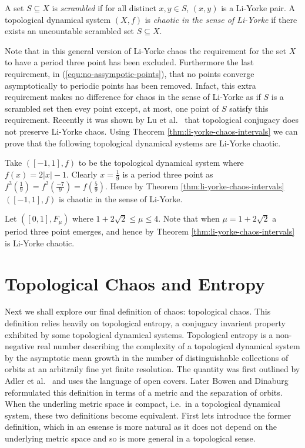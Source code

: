 \begin{defn}  \label{defn:scrambled-set}
    A set $S \subseteq X$ is \emph{scrambled} if for all distinct $x, y \in S$, $(x, y)$ is a Li-Yorke pair. A topological dynamical system $(X, f)$ is \emph{chaotic in the sense of Li-Yorke} if there exists an uncountable scrambled set $S \subseteq X$.
\end{defn}

Note that in this general version of Li-Yorke chaos the requirement for the set $X$ to have a period three point has been excluded. Furthermore the last requirement, in (\ref{equ:no-assympotic-points}), that no points converge asymptotically to periodic points has been removed. Infact, this extra requirement makes no difference for chaos in the sense of Li-Yorke as if $S$ is a scrambled set then evey point except, at most, one point of $S$ satisfy this requirement. Recently it was shown by Lu et al.\ \cite{lu-zhu-wu} that topological conjugacy does not preserve Li-Yorke chaos. Using Theorem \ref{thm:li-yorke-chaos-intervals} we can prove that the following topological dynamical systems are Li-Yorke chaotic.

\begin{exmp}
    Take $([-1, 1], f)$ to be the topological dynamical system where $f(x) = 2 |x| - 1$. Clearly $x = \frac{1}{9}$ is a period three point as $f^3\left(\frac{1}{9}\right) = f^2\left(\frac{-7}{9}\right) = f\left(\frac{5}{9}\right)$. Hence by Theorem \ref{thm:li-yorke-chaos-intervals} $([-1, 1], f)$ is chaotic in the sense of Li-Yorke.
\end{exmp}

\begin{exmp}
    Let $([0, 1], F_\mu)$ where $1 + 2\sqrt{2} \leq \mu \leq 4$. Note that when $\mu = 1 + 2\sqrt{2}$ a period three point emerges, and hence by Theorem \ref{thm:li-yorke-chaos-intervals} is Li-Yorke chaotic.
\end{exmp}

\section{Topological Chaos and Entropy} \label{sec:topological-chaos}
Next we shall explore our final definition of chaos: topological chaos. This definition relies heavily on topological entropy, a conjugacy invarient property exhibited by some topological dynamical systems. Topological entropy is a non-negative real number describing the complexity of a topological dynamical system by the asymptotic mean growth in the number of distinguishable collections of orbits at an arbitraily fine yet finite resolution. The quantity was first outlined by Adler et al.\ \cite{adler} and uses the language of open covers. Later Bowen \cite{bowen} and Dinaburg \cite{dinaburg} reformulated this definition in terms of a metric and the separation of orbits. When the underling metric space is compact, i.e.\ in a topological dynamical system, these two definitions become equivalent. First lets introduce the former definition, which in an essense is more natural as it does not depend on the underlying metric space and so is more general in a topological sense.


